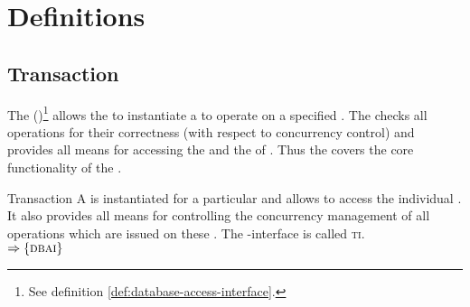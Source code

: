 \documentclass[a4paper, 12pt]{book}
\newcommand{\INTERFACE}[1]{$\Rightarrow\left\{#1\right\}$}
\begin{document}


\section{Definitions}


\subsection{Transaction}


The  (\DBAI)\footnote{See definition
  \vref{def:database-access-interface}.} allows the  to instantiate
a  to operate on a specified . The
 checks all operations for their correctness (with respect to
concurrency control) and provides all means for accessing the  and the  of . Thus the
 covers the core functionality of the \DBAI.
\newcommand{\TRANSACTION}{{\normalfont\textsc{ti}}\xspace}
\begin{definition*}{Transaction}
  \label{def:transaction}
  A  is instantiated for a particular  and
  allows to access the individual . It also provides all
  means for controlling the concurrency management of all operations
  which are issued on these .
  The -interface is called \TRANSACTION.\\
  \INTERFACE{\DBAI}
\end{definition*}
\end{document}
